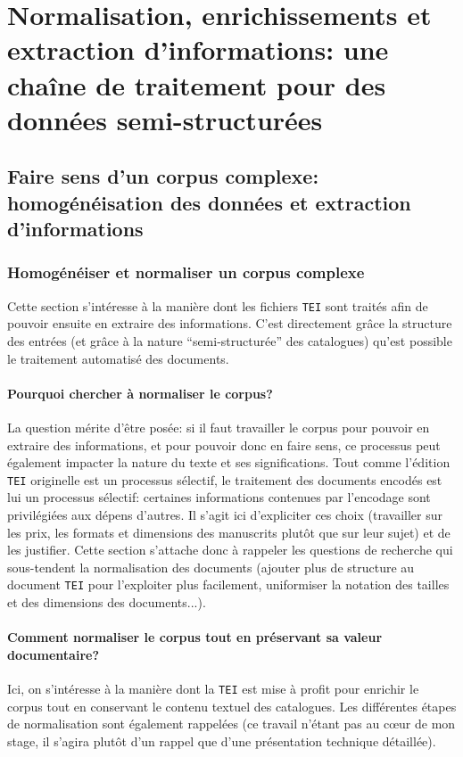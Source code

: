 \documentclass[a4paper, 12pt, twoside]{book}
\newcommand{\tei}{\texttt{TEI}}
\begin{document}
\part{Normalisation, enrichissements et extraction d'informations: une chaîne de traitement pour des données semi-structurées}

\chapter{Faire sens d'un corpus complexe: homogénéisation des données et extraction d'informations}

\section{Homogénéiser et normaliser un corpus complexe}
Cette section s'intéresse à la manière dont les fichiers \tei{} sont traités afin de pouvoir ensuite en extraire des informations. C'est directement grâce la structure des entrées (et grâce à la nature \enquote{semi-structurée} des catalogues) qu'est possible le traitement automatisé des documents.

\subsection{Pourquoi chercher à normaliser le corpus?}
La question mérite d'être posée: si il faut travailler le corpus pour pouvoir en extraire des informations, et pour pouvoir donc en faire sens, ce processus peut également impacter la nature du texte et ses significations. Tout comme l'édition \tei{} originelle est un processus sélectif, le traitement des documents encodés est lui un processus sélectif: certaines informations contenues par l'encodage sont privilégiées aux dépens d'autres. Il s'agit ici d'expliciter ces choix (travailler sur les prix, les formats et dimensions des manuscrits plutôt que sur leur sujet) et de les justifier. Cette section s'attache donc à rappeler les questions de recherche qui sous-tendent la normalisation des documents (ajouter plus de structure au document \tei{} pour l'exploiter plus facilement, uniformiser la notation des tailles et des dimensions des documents...).

\subsection{Comment normaliser le corpus tout en préservant sa valeur documentaire?}
Ici, on s'intéresse à la manière dont la \tei{} est mise à profit pour enrichir le corpus tout en conservant le contenu textuel des catalogues. Les différentes étapes de normalisation sont également rappelées (ce travail n'étant pas au cœur de mon stage, il s'agira plutôt d'un rappel que d'une présentation technique détaillée).
\end{document}
